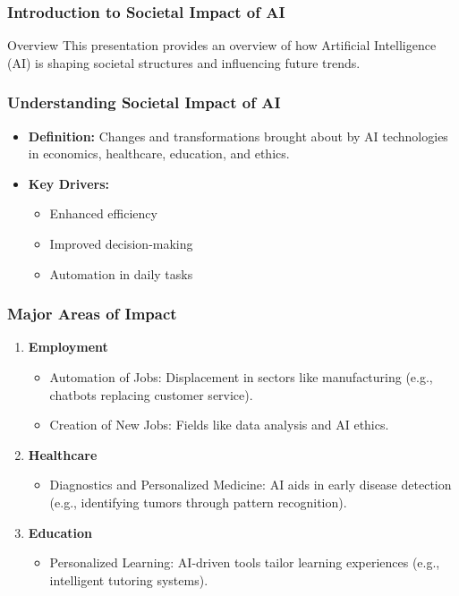 \documentclass[aspectratio=169]{beamer}
\begin{document}
\frame{\titlepage}

\begin{frame}[fragile]
    \frametitle{Introduction to Societal Impact of AI}
    \begin{block}{Overview}
        This presentation provides an overview of how Artificial Intelligence (AI) is shaping societal structures and influencing future trends.
    \end{block}
\end{frame}

\begin{frame}[fragile]
    \frametitle{Understanding Societal Impact of AI}
    \begin{itemize}
        \item \textbf{Definition:} Changes and transformations brought about by AI technologies in economics, healthcare, education, and ethics.
        \item \textbf{Key Drivers:}
        \begin{itemize}
            \item Enhanced efficiency
            \item Improved decision-making
            \item Automation in daily tasks
        \end{itemize}
    \end{itemize}
\end{frame}

\begin{frame}[fragile]
    \frametitle{Major Areas of Impact}
    \begin{enumerate}
        \item \textbf{Employment}
        \begin{itemize}
            \item Automation of Jobs: Displacement in sectors like manufacturing (e.g., chatbots replacing customer service).
            \item Creation of New Jobs: Fields like data analysis and AI ethics.
        \end{itemize}
        
        \item \textbf{Healthcare}
        \begin{itemize}
            \item Diagnostics and Personalized Medicine: AI aids in early disease detection (e.g., identifying tumors through pattern recognition).
        \end{itemize}
        
        \item \textbf{Education}
        \begin{itemize}
            \item Personalized Learning: AI-driven tools tailor learning experiences (e.g., intelligent tutoring systems).
        \end{itemize}
    \end{enumerate}
\end{frame}
\end{document}
